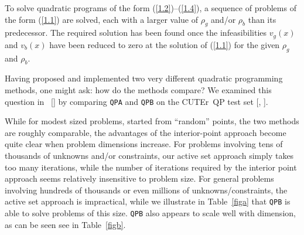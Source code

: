 \documentclass[acmtocl,acmnow]{acmtrans2m}
\newcommand{\req}[1]{(\ref{#1})}
\newcommand{\cuter}{{\sf CUTEr}}
\newcommand{\citebb}[1]{\citeauthor{#1}\ [\citeyear{#1}]}
\newcommand{\bciteb}[1]{\citeauthor{#1}, \citeyear{#1}}
\begin{document}
To solve quadratic programs of the form \req{1.2}--\req{1.4},
a sequence of problems of the form \req{1.1} are
solved, each with a larger value of $\rho_g$ and/or $\rho_b$
than its predecessor. The
required solution has been found once the infeasibilities
$v_g(x)$ and $v_b(x)$ have been reduced to zero at the solution of
\req{1.1} for the given $\rho_g$ and $\rho_b$.

Having proposed and implemented two very different quadratic programming
methods, one might ask: how do the methods compare? We examined
this question in \citebb{GoulToin01c} by comparing {\tt QPA} and {\tt QPB}
on the \cuter\ QP test set [\bciteb{GoulOrbaToin02b}].

While for modest sized problems, started from ``random'' points, the two
methods are roughly comparable, the advantages of the interior-point approach
become quite clear when problem dimensions increase. For problems involving
tens of thousands of unknowns and/or constraints, our active set approach
simply takes too many iterations, while the number of iterations
required by the interior point approach seems relatively insensitive to
problem size. For general problems involving hundreds of thousands or
even millions of unknowns/constraints, the active set approach is impractical,
while we illustrate in Table~\ref{figa} that
{\tt QPB} is able to solve problems of this size.
{\tt QPB} also appears to scale well with dimension, as can be seen
see in Table~\ref{figb}.
\end{document}
